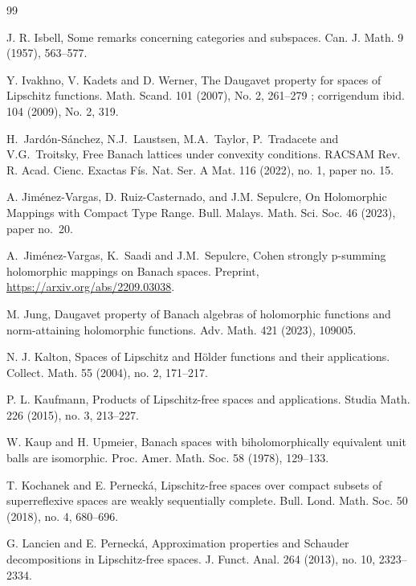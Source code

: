 \documentclass[12pt,leqno]{amsart}
\numberwithin{equation}{section} %
\theoremstyle{definition}
\numberwithin{equation}{section}
\begin{document}
\begin{thebibliography}{99}

J. R. Isbell, Some remarks concerning categories and subspaces. Can. J. Math. 9 (1957), 563--577. 

Y. Ivakhno, V. Kadets and D. Werner, The Daugavet property for spaces of Lipschitz functions. Math. Scand. 101 (2007), No. 2, 261--279 ; corrigendum ibid. 104 (2009), No. 2, 319. 

H.~Jard\'on-S\'anchez, N.J.~Laustsen, M.A.~Taylor, P.~Tradacete and V.G.~Troitsky, Free Banach lattices under convexity conditions.  RACSAM Rev. R. Acad. Cienc. Exactas F\'is. Nat. Ser. A Mat. 116 (2022), no. 1, paper no. 15.


A. Jim\'enez-Vargas, D. Ruiz-Casternado, and J.M. Sepulcre, On Holomorphic Mappings with Compact Type Range. Bull. Malays. Math. Sci. Soc. 46 (2023), paper no.~20.


 A.~Jim\'enez-Vargas, K.~Saadi and J.M.~Sepulcre, Cohen strongly p-summing holomorphic mappings on Banach spaces. Preprint, \url{https://arxiv.org/abs/2209.03038}.

 M. Jung, Daugavet property of Banach algebras of holomorphic functions and norm-attaining holomorphic functions. Adv. Math. 421 (2023), 109005.

 N. J. Kalton, Spaces of Lipschitz and H\"older functions and their applications. Collect. Math. 55 (2004), no. 2, 171--217.

 P. L. Kaufmann, Products of Lipschitz-free spaces and applications. Studia Math. 226 (2015), no. 3, 213--227. 

W. Kaup and H. Upmeier, Banach spaces with biholomorphically equivalent unit balls are isomorphic. Proc. Amer. Math. Soc. 58 (1978), 129--133.

 T. Kochanek and E. Perneck\'a, Lipschitz-free spaces over compact subsets of superreflexive spaces are weakly sequentially complete. Bull. Lond. Math. Soc. 50 (2018), no. 4, 680--696. 

 G. Lancien and E. Perneck\'a, Approximation properties and Schauder decompositions in Lipschitz-free spaces. J. Funct. Anal. 264 (2013), no. 10, 2323--2334. 


\end{thebibliography}
\end{document}
